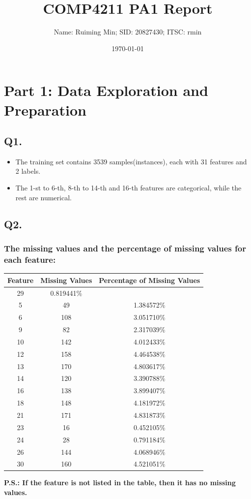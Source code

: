 \documentclass{article}
\title{COMP4211 PA1 Report}
\author{Name: Ruiming Min; SID: 20827430; ITSC: rmin}
\date{\today}
\begin{document}
    
\maketitle

\section*{Part 1: Data Exploration and Preparation}

\subsection*{Q1.}
\begin{itemize}
    \item The training set contains 3539 samples(instances), each with 31 features and 2 labels.
    \item The 1-st to 6-th, 8-th to 14-th and 16-th features are categorical, while the rest are numerical.
\end{itemize}

\subsection*{Q2.}

\subsubsection*{The missing values and the percentage of missing values for each feature:}
\begin{center}
    \begin{tabular}{|c|c|c|}
        \hline
        Feature & Missing Values & Percentage of Missing Values \\
        \hline
        29 & 0.819441\% \\
        5 & 49 & 1.384572\% \\
        6 & 108 & 3.051710\% \\
        9 & 82 & 2.317039\% \\
        10 & 142 & 4.012433\% \\
        12 & 158 & 4.464538\% \\
        13 & 170 & 4.803617\% \\
        14 & 120 & 3.390788\% \\
        16 & 138 & 3.899407\% \\
        18 & 148 & 4.181972\% \\
        21 & 171 & 4.831873\% \\
        23 & 16 & 0.452105\% \\
        24 & 28 & 0.791184\% \\
        26 & 144 & 4.068946\% \\
        30 & 160 & 4.521051\% \\
        \hline
    \end{tabular}
    \newline
    \textbf{P.S.: If the feature is not listed in the table, then it has no missing values.}
\end{center}
\end{document}
